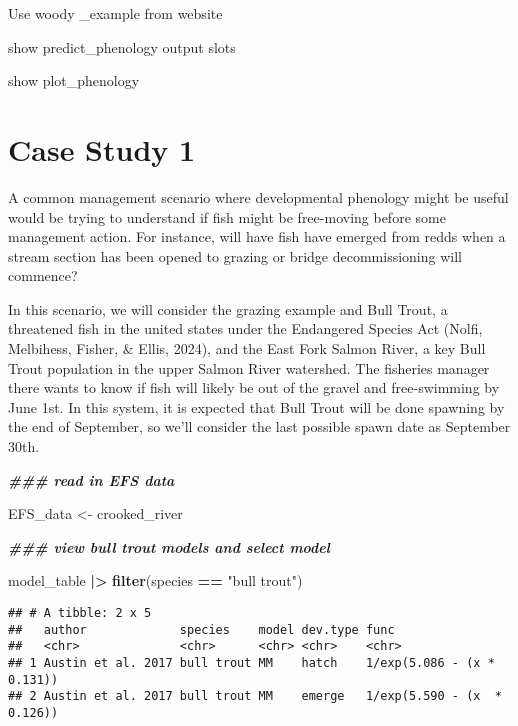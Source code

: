 \documentclass[12pt,halfline,a4paper,]{ouparticle}
\newenvironment{Shaded}{\begin{snugshade}}{\end{snugshade}}
\newcommand{\DocumentationTok}[1]{\textcolor[rgb]{0.56,0.35,0.01}{\textbf{\textit{#1}}}}
\newcommand{\FunctionTok}[1]{\textcolor[rgb]{0.13,0.29,0.53}{\textbf{#1}}}
\newcommand{\NormalTok}[1]{#1}
\newcommand{\OtherTok}[1]{\textcolor[rgb]{0.56,0.35,0.01}{#1}}
\newcommand{\SpecialCharTok}[1]{\textcolor[rgb]{0.81,0.36,0.00}{\textbf{#1}}}
\newcommand{\StringTok}[1]{\textcolor[rgb]{0.31,0.60,0.02}{#1}}
\begin{document}
Use woody \_example from website

show predict\_phenology output slots

show plot\_phenology

\section{Case Study 1}\label{case-study-1}

A common management scenario where developmental phenology might be
useful would be trying to understand if fish might be free-moving before
some management action. For instance, will have fish have emerged from
redds when a stream section has been opened to grazing or bridge
decommissioning will commence?

In this scenario, we will consider the grazing example and Bull Trout, a
threatened fish in the united states under the Endangered Species Act
(Nolfi, Melbihess, Fisher, \& Ellis, 2024), and the East Fork Salmon
River, a key Bull Trout population in the upper Salmon River watershed.
The fisheries manager there wants to know if fish will likely be out of
the gravel and free-swimming by June 1st. In this system, it is expected
that Bull Trout will be done spawning by the end of September, so we'll
consider the last possible spawn date as September 30th.

\begin{Shaded}
\begin{Highlighting}[]
\DocumentationTok{\#\#\# read in EFS data}

\NormalTok{EFS\_data }\OtherTok{\textless{}{-}}\NormalTok{ crooked\_river}

\DocumentationTok{\#\#\# view bull trout models and select model}

\NormalTok{model\_table }\SpecialCharTok{|\textgreater{}} 
  \FunctionTok{filter}\NormalTok{(species }\SpecialCharTok{==} \StringTok{"bull trout"}\NormalTok{)}
\end{Highlighting}
\end{Shaded}

\begin{verbatim}
## # A tibble: 2 x 5
##   author             species    model dev.type func                       
##   <chr>              <chr>      <chr> <chr>    <chr>                      
## 1 Austin et al. 2017 bull trout MM    hatch    1/exp(5.086 - (x * 0.131)) 
## 2 Austin et al. 2017 bull trout MM    emerge   1/exp(5.590 - (x  * 0.126))
\end{verbatim}
\end{document}
